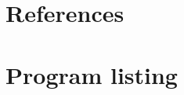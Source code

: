\documentclass[pdftex,12pt,a4paper]{report}
\begin{document}


\tableofcontents
\listoffigures
\listoftables













\appendix
\chapter{References}








\chapter{Program listing}
\end{document}
